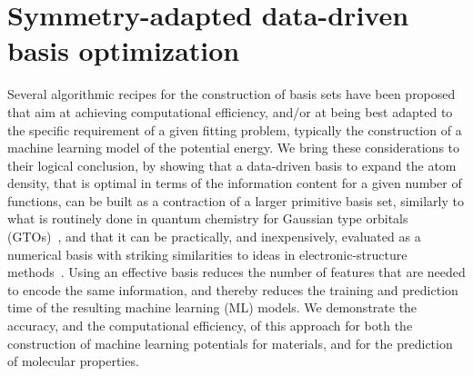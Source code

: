 \chapter{Symmetry-adapted data-driven basis optimization}
\label{sec:basisopt}

Several algorithmic recipes for the construction of basis sets have been proposed~\cite{shapeev2016moment, drau19prb, dusson2022atomic, musil2021efficient} that aim at achieving computational efficiency, and/or at being best adapted to the specific requirement of a given fitting problem, typically the construction of a machine learning model of the potential energy.
We bring these considerations to their logical conclusion, by showing that a data-driven basis to expand the atom density, that is optimal in terms of the information content for a given number of functions, can be built as a contraction of a larger primitive basis set, similarly to what is routinely done in quantum chemistry for Gaussian type orbitals (GTOs)~\cite{scha+92jcp}, and that it can be practically, and inexpensively, evaluated as a numerical basis with striking similarities to ideas in electronic-structure methods~\cite{AIMS}.
Using an effective basis reduces the number of features that are needed to encode the same information, and thereby reduces the training and prediction time of the resulting machine learning (ML) models.
We demonstrate the accuracy, and the computational efficiency, of this approach for both the construction of machine learning potentials for materials, and for the prediction of molecular properties. 

